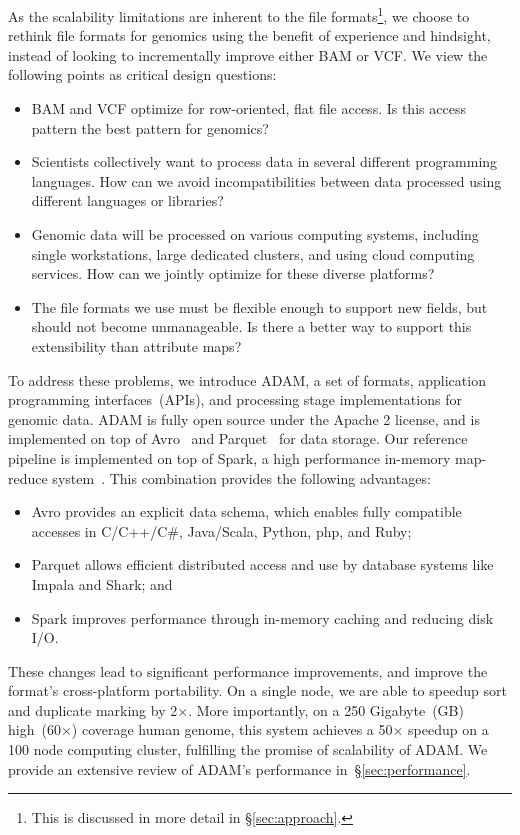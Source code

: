 \documentclass{bioinfo}
\begin{document}
As the scalability limitations are inherent to the file formats\footnote{This is discussed in more detail in \S\ref{sec:approach}.}, we choose to rethink file formats for genomics
using the benefit of experience and hindsight, instead of looking to incrementally improve either BAM or VCF. We view the following points as critical design questions:

\begin{itemize}
\item BAM and VCF optimize for row-oriented, flat file access. Is this access pattern the best pattern for genomics?
\item Scientists collectively want to process data in several different programming languages. How can we avoid incompatibilities between
data processed using different languages or libraries?
\item Genomic data will be processed on various computing systems, including single workstations, large dedicated clusters,
and using cloud computing services. How can we jointly optimize for these diverse platforms?
\item The file formats we use must be flexible enough to support new fields, but should not become unmanageable. Is there a better
way to support this extensibility than attribute maps?
\end{itemize}

To address these problems, we introduce ADAM, a set of formats, application programming interfaces~(APIs), and processing stage
implementations for genomic data. ADAM is fully open source under the Apache 2 license, and is implemented on top of Avro~\citep{avro}
and Parquet~\citep{parquet} for data storage. Our reference pipeline is implemented on top of Spark, a high performance in-memory map-reduce
system~\citep{zaharia10}. This combination provides the following advantages:

\begin{itemize}
\item Avro provides an explicit data schema, which enables fully compatible accesses in C/C++/C\#, Java/Scala, Python, php, and Ruby;
\item Parquet allows efficient distributed access and use by database systems like Impala and Shark; and 
\item Spark improves performance through in-memory caching and reducing disk I/O.
\end{itemize}

These changes lead to significant performance improvements, and improve the format's cross-platform portability. On a single
node, we are able to speedup sort and duplicate marking by 2$\times$. More importantly, on a 250 Gigabyte~(GB) high~(60$\times$) coverage
human genome, this system achieves a 50$\times$ speedup on a 100 node computing cluster, fulfilling the promise of scalability of ADAM.
We provide an extensive review of ADAM's performance in~\S\ref{sec:performance}.
\end{document}
